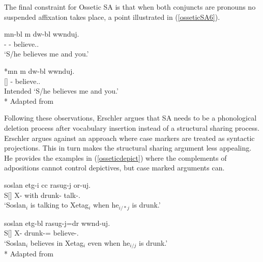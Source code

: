The final constraint for Ossetic SA is that when both conjuncts are pronouns no suspended affixation takes place, a point illustrated in (\ref{osseticSA6}).

\begin{exe}
    \ex \label{osseticSA6}
    \begin{xlist}
    \ex \gll 
    {m\textturna n-b\textturna l} {\textturna m\textturna} {d\textturna w-b\textturna l} {\textturna ww\textturna nduj}. \\ {\Fsg}-{\Sup} {\And} {\Ssg}-{\Sup} believe.{\Prs}.{\Third}{\Sg} \\
    \glt `S/he believes me and you.'
    
    \ex \gll 
    {*m\textturna n} {\textturna m\textturna} {d\textturna w-b\textturna l} {\textturna ww\textturna nduj}. \\ {\Fsg}[{\Obl}] {\And} {\Ssg}-{\Sup} believe.{\Prs}.{\Third}{\Sg} \\
    \glt Intended `S/he believes me and you.'\\*
    \hfill Adapted from \citet{erschler2012suspended}
    \end{xlist}
\end{exe}

Following these observations, Erschler argues that SA needs to be a phonological deletion process after vocabulary insertion instead of a structural sharing process. Erschler argues against an approach where case markers are treated as syntactic projections. This in turn makes the structural sharing argument less appealing. He provides the examples in (\ref{osseticdepict}) where the complements of adpositions cannot control depictives, but case marked arguments can.

\begin{exe}
    \ex \label{osseticdepict}
    \begin{xlist}
        \ex \gll 
        {soslan} {\textchi et\textturna g-i} {\textchi\textturna cc\textturna} {rasug-\textturna j} {\textdzlig or-uj}. \\ S[{\Nom}] X-{\Obl} with drunk-{\Abl} talk-{\Prs}.{\Third}{\Sg} \\
        \glt `Soslan$_i$ is talking to Xetag$_i$ when he$_{i/*j}$ is drunk.'
    
        \ex \gll 
        {soslan} {\textchi et\textturna g-b\textturna l} {rasug-\textturna j=d\textturna r} {\textturna ww\textturna nd-uj}. \\ S[{\Nom}] X-{\Sup} drunk-{\Abl}={\Emp} believe-{\Prs}.{\Third}{\Sg} \\
        \glt `Soslan$_i$ believes in Xetag$_i$ even when he$_{i/j}$ is drunk.'\\*
        \hfill Adapted from \citet{erschler2012suspended}
    \end{xlist}
\end{exe}

